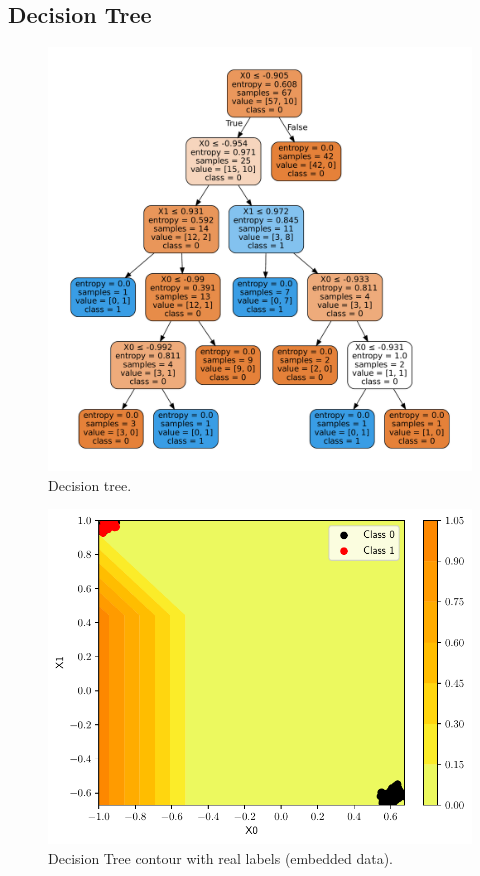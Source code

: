 \documentclass[conference]{IEEEtran}
\theoremstyle{definition}
\theoremstyle{remark}
\theoremstyle{remark}
\begin{document}
\subsection{Decision Tree}
\begin{figure}
    \includegraphics[width=\columnwidth]{figs/tree-emb-graph.pdf}
    \caption{Decision tree.}
    \label{fig:dte}
\end{figure}

\begin{figure}
    \includegraphics[width=\columnwidth]{figs/tree-contour-0-1.pdf}
    \caption{Decision Tree contour with real labels (embedded data).}
    \label{fig:dte_cont}
\end{figure}
\end{document}
